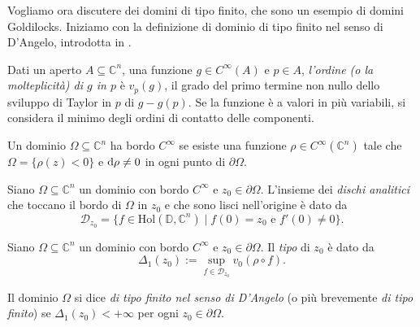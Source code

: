 Vogliamo ora discutere dei domini di tipo finito, che sono un esempio di domini Goldilocks. Iniziamo con la definizione di dominio di tipo finito nel senso di D'Angelo, introdotta in \cite{D'A}.

\begin{defn}
    Dati un aperto $A\subseteq\mathbb{C}^n$, una funzione $g\in C^\infty(A)$ e $p\in A$, \textit{l'ordine (o la molteplicità) di $g$ in $p$} è $v_p(g)$, il grado del primo termine non nullo dello sviluppo di Taylor in $p$ di $g-g(p)$. Se la funzione è a valori in più variabili, si considera il minimo degli ordini di contatto delle componenti.
\end{defn}

\begin{defn}
    Un dominio $\Omega\subseteq\mathbb{C}^n$ ha bordo $C^\infty$ se esiste una funzione $\rho\in C^\infty(\mathbb{C}^n)$ tale che $\Omega=\{\rho(z)<0\}$ e $\mathop{}\!\mathrm{d}\rho\not=0$ in ogni punto di $\partial\Omega$.
\end{defn}
    
\begin{defn}
    Siano $\Omega\subseteq\mathbb{C}^n$ un dominio con bordo $C^\infty$ e $z_0\in\partial\Omega$. L'insieme dei \textit{dischi analitici} che toccano il bordo di $\Omega$ in $z_0$ e che sono lisci nell'origine è dato da
    $$\mathcal{D}_{z_0}=\{f\in\text{Hol}(\mathbb{D},\mathbb{C}^n)\mid f(0)=z_0\text{ e }f'(0)\not=0\}.$$
\end{defn}

\begin{defn}
    Siano $\Omega\subseteq\mathbb{C}^n$ un dominio con bordo $C^\infty$ e $z_0\in\partial\Omega$. Il \textit{tipo} di $z_0$ è dato da
    $$\Delta_1(z_0):=\sup_{f\in\mathcal{D}_{z_0}} v_0(\rho\circ f).$$

    Il dominio $\Omega$ si dice \textit{di tipo finito nel senso di D'Angelo} (o più brevemente \textit{di tipo finito}) se $\Delta_1(z_0)<+\infty$ per ogni $z_0\in\partial\Omega$.
\end{defn}

